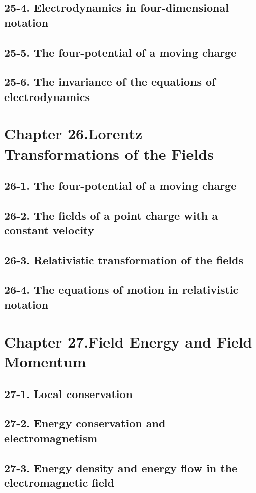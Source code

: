 \documentclass{article}
\begin{document}
\subsection{25-4. Electrodynamics in four-dimensional notation}
\subsection{25-5. The four-potential of a moving charge}
\subsection{25-6. The invariance of the equations of electrodynamics}
\section{Chapter 26.Lorentz Transformations of the Fields}
\subsection{26-1. The four-potential of a moving charge}
\subsection{26-2. The fields of a point charge with a constant velocity}
\subsection{26-3. Relativistic transformation of the fields}
\subsection{26-4. The equations of motion in relativistic notation}
\section{Chapter 27.Field Energy and Field Momentum}
\subsection{27-1. Local conservation}
\subsection{27-2. Energy conservation and electromagnetism}
\subsection{27-3. Energy density and energy flow in the electromagnetic field}
\end{document}
